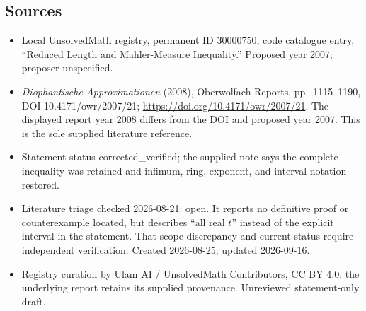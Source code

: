 \documentclass[11pt]{article}
\begin{document}
\subsection{Sources}
\begin{itemize}
\item Local UnsolvedMath registry, permanent ID 30000750, code catalogue entry, ``Reduced Length and Mahler-Measure Inequality.'' Proposed year 2007; proposer unspecified.
\item \emph{Diophantische Approximationen} (2008), Oberwolfach Reports, pp.\ 1115--1190, DOI 10.4171/owr/2007/21; \url{https://doi.org/10.4171/owr/2007/21}. The displayed report year 2008 differs from the DOI and proposed year 2007. This is the sole supplied literature reference.
\item Statement status corrected\_verified; the supplied note says the complete inequality was retained and infimum, ring, exponent, and interval notation restored.
\item Literature triage checked 2026-08-21: open. It reports no definitive proof or counterexample located, but describes ``all real $t$'' instead of the explicit interval in the statement. That scope discrepancy and current status require independent verification. Created 2026-08-25; updated 2026-09-16.
\item Registry curation by Ulam AI / UnsolvedMath Contributors, CC BY 4.0; the underlying report retains its supplied provenance. Unreviewed statement-only draft.
\end{itemize}
\end{document}
